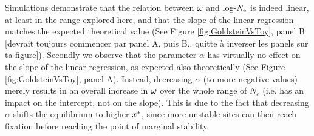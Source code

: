\documentclass{article}
\begin{document}
	Simulations demonstrate that the relation between $\omega$ and log-$N_{\mathrm{e}}$ is indeed linear, at least in the range explored here, and that the slope of the linear regression matches the expected theoretical value (See Figure \ref{fig:GoldsteinVsToy}, panel B [devrait toujours commencer par panel A, puis B.. quitte à inverser les panels sur ta figure]).
	Secondly we observe that the parameter $\alpha$ has virtually no effect on the slope of the linear regression, as expected also theoretically (See Figure \ref{fig:GoldsteinVsToy}, panel A). Instead, decreasing $\alpha$ (to more negative values) merely results in an overall increase in $\omega$ over the whole range of $N_e$ (i.e. has an impact on the intercept, not on the slope). This is due to the fact that decreasing $\alpha$ shifts the equilibrium to higher $x^{*}$, since more unstable sites can then reach fixation before reaching the point of marginal stability.\\
	
\end{document}
